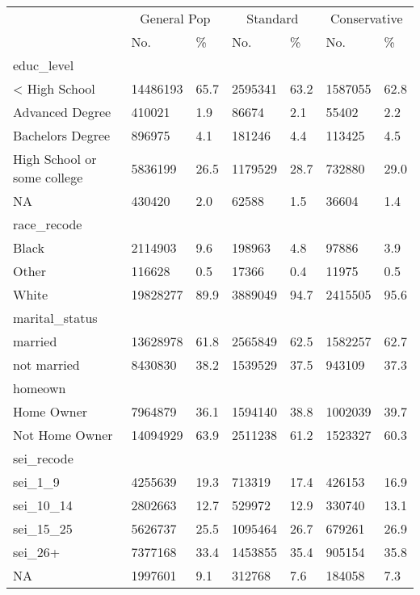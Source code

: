 \captionsetup[table]{labelformat=empty,skip=1pt}
\begin{longtable}{lllllll}
\toprule
& \multicolumn{2}{c}{General Pop} & \multicolumn{2}{c}{Standard} & \multicolumn{2}{c}{Conservative} \\ 
 \cmidrule(lr){2-3}\cmidrule(lr){4-5}\cmidrule(lr){6-7}
 & No. & \% & No. & \% & No. & \% \\ 
\midrule
\multicolumn{1}{l}{educ\_level} \\ 
\midrule
< High School & 14486193 & 65.7 & 2595341 & 63.2 & 1587055 & 62.8 \\ 
Advanced Degree & 410021 & 1.9 & 86674 & 2.1 & 55402 & 2.2 \\ 
Bachelors Degree & 896975 & 4.1 & 181246 & 4.4 & 113425 & 4.5 \\ 
High School or some college & 5836199 & 26.5 & 1179529 & 28.7 & 732880 & 29.0 \\ 
NA & 430420 & 2.0 & 62588 & 1.5 & 36604 & 1.4 \\ 
\midrule
\multicolumn{1}{l}{race\_recode} \\ 
\midrule
Black & 2114903 & 9.6 & 198963 & 4.8 & 97886 & 3.9 \\ 
Other & 116628 & 0.5 & 17366 & 0.4 & 11975 & 0.5 \\ 
White & 19828277 & 89.9 & 3889049 & 94.7 & 2415505 & 95.6 \\ 
\midrule
\multicolumn{1}{l}{marital\_status} \\ 
\midrule
married & 13628978 & 61.8 & 2565849 & 62.5 & 1582257 & 62.7 \\ 
not married & 8430830 & 38.2 & 1539529 & 37.5 & 943109 & 37.3 \\ 
\midrule
\multicolumn{1}{l}{homeown} \\ 
\midrule
Home Owner & 7964879 & 36.1 & 1594140 & 38.8 & 1002039 & 39.7 \\ 
Not Home Owner & 14094929 & 63.9 & 2511238 & 61.2 & 1523327 & 60.3 \\ 
\midrule
\multicolumn{1}{l}{sei\_recode} \\ 
\midrule
sei\_1\_9 & 4255639 & 19.3 & 713319 & 17.4 & 426153 & 16.9 \\ 
sei\_10\_14 & 2802663 & 12.7 & 529972 & 12.9 & 330740 & 13.1 \\ 
sei\_15\_25 & 5626737 & 25.5 & 1095464 & 26.7 & 679261 & 26.9 \\ 
sei\_26+ & 7377168 & 33.4 & 1453855 & 35.4 & 905154 & 35.8 \\ 
NA & 1997601 & 9.1 & 312768 & 7.6 & 184058 & 7.3 \\ 

\end{longtable}
